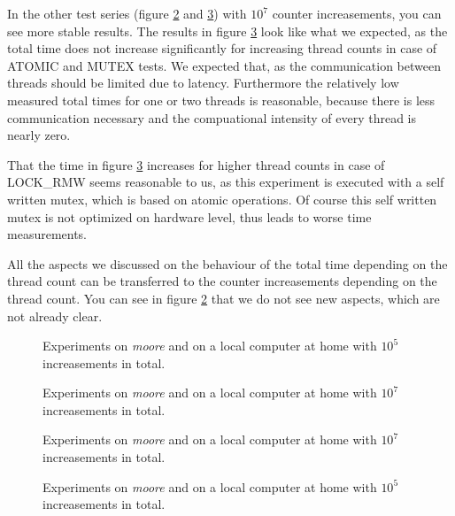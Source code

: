 \documentclass[oneside,a4paper]{scrartcl}
\begin{document}
In the other test series (figure \ref{plotbig} and \ref{plotbigtotal}) with
$10^7$ counter increasements, you can see more stable results. The results
in figure \ref{plotbigtotal} look like what we expected, as the total
time does not increase significantly for increasing thread counts
in case of ATOMIC and MUTEX tests.
We expected that, as the communication between threads should be
limited due to latency. Furthermore the relatively low measured total
times for one or two threads is reasonable, because there is less
communication necessary and the compuational intensity of every thread
is nearly zero.

That the time in figure \ref{plotbigtotal} increases for higher thread
counts in case of LOCK\_RMW seems reasonable to us, as this experiment
is executed with a self written mutex, which is based on atomic operations.
Of course this self written mutex is not optimized on hardware level, thus
leads to worse time measurements.

All the aspects we discussed on the behaviour of the total time depending
on the thread count can be transferred to the counter increasements
depending on the thread count. You can see in figure \ref{plotbig} that
we do not see new aspects, which are not already clear.

\begin{figure}
	\centering
	\caption{Experiments on \emph{moore} and on a local computer at home
	with $10^5$ increasements in total.}
	\label{plot}
\end{figure}

\begin{figure}
	\centering
	\caption{Experiments on \emph{moore} and on a local computer at home
	with $10^7$ increasements in total.}
	\label{plotbig}
\end{figure}

\begin{figure}
	\centering
	\caption{Experiments on \emph{moore} and on a local computer at home
	with $10^7$ increasements in total.}
	\label{plotbigtotal}
\end{figure}
\begin{figure}
	\centering
	\caption{Experiments on \emph{moore} and on a local computer at home
	with $10^5$ increasements in total.}
	\label{plottotal}
\end{figure}
\end{document}
